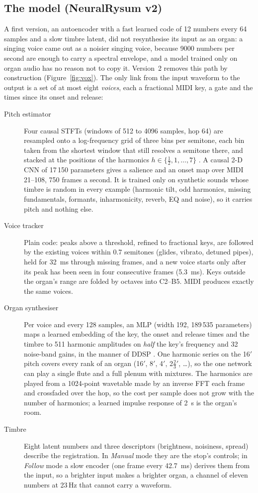 \documentclass[11pt,a4paper,parskip=half,DIV=11,toc=bibliography]{scrartcl}
\begin{document}
\subsection{The model (NeuralRysum v2)}
A first version, an autoencoder with a fast learned code of 12 numbers every 64 samples and a slow timbre latent, did not resynthesise its input as an
organ: a singing voice came out as a noisier singing voice, because 9000 numbers per second are enough to carry a spectral envelope, and a model trained
only on organ audio has no reason not to copy it. Version~2 removes this path by construction (Figure~\ref{fig:vox}). The only link from the input
waveform to the output is a set of at most eight \emph{voices}, each a fractional MIDI key, a gate and the times since its onset and release:
\begin{description}
  \item[Pitch estimator] Four causal STFTs (windows of 512 to 4096 samples, hop 64) are resampled onto a log-frequency grid of three bins per semitone,
        each bin taken from the shortest window that still resolves a semitone there, and stacked at the positions of the harmonics $h\in\{\frac12,1,\dots,7\}$
        \citep{bittner2017salience}. A causal 2-D CNN of 17\,150 parameters gives a salience and an onset map over MIDI 21--108, 750 frames a second.
        It is trained only on synthetic sounds whose timbre is random in every example (harmonic tilt, odd harmonics, missing fundamentals, formants,
        inharmonicity, reverb, EQ and noise), so it carries pitch and nothing else.
  \item[Voice tracker] Plain code: peaks above a threshold, refined to fractional keys, are followed by the existing voices within 0.7 semitones (glides,
        vibrato, detuned pipes), held for \SI{32}{ms} through missing frames, and a new voice starts only after its peak has been seen in four consecutive
        frames (\SI{5.3}{ms}). Keys outside the organ's range are folded by octaves into C2--B5. MIDI produces exactly the same voices.
  \item[Organ synthesiser] Per voice and every 128 samples, an MLP (width 192, 189\,535 parameters) maps a learned embedding of the key, the onset and
        release times and the timbre to 511 harmonic amplitudes on \emph{half} the key's frequency and 32 noise-band gains, in the manner of DDSP
        \citep{engel2020ddsp}. One harmonic series on the 16$'$ pitch covers every rank of an organ (16$'$, 8$'$, 4$'$, 2$\frac23'$, \dots), so the one
        network can play a single flute and a full plenum with mixtures. The harmonics are played from a 1024-point wavetable made by an inverse FFT each
        frame and crossfaded over the hop, so the cost per sample does not grow with the number of harmonics; a learned impulse response of \SI{2}{s}
        is the organ's room.
  \item[Timbre] Eight latent numbers and three descriptors (brightness, noisiness, spread) describe the registration. In \emph{Manual} mode they are the
        stop's controls; in \emph{Follow} mode a slow encoder (one frame every \SI{42.7}{ms}) derives them from the input, so a brighter input makes a
        brighter organ, a channel of eleven numbers at 23\,Hz that cannot carry a waveform.
\end{description}
\end{document}
